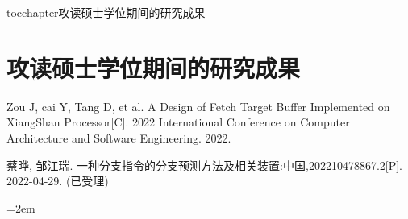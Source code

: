 
\newenvironment{thepublications}{\wuhao\song}

\addcontentsline{toc}{chapter}{攻读硕士学位期间的研究成果}%
\chapter*{\centering\xiaosan\hei\bfseries 攻读硕士学位期间的研究成果}

\begin{thepublications}

\setlength{\parindent}{0em}
\begin{publist}
	\item Zou J, cai Y, Tang D, et al. A Design of Fetch Target Buffer Implemented on XiangShan Processor[C]. 2022 International Conference on Computer Architecture and Software Engineering. 2022.
    \item 蔡晔, 邹江瑞. 一种分支指令的分支预测方法及相关装置:中国,202210478867.2[P]. 2022-04-29. (已受理)
\end{publist}

\vfill
{}\hangindent=2em\noindent

\setlength{\parindent}{2em}

\end{thepublications}

